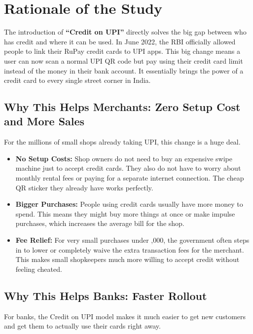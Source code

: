 \chapter{Rationale of the Study}

The introduction of \textbf{``Credit on UPI''} directly solves the big gap between who has credit and where it can be used. In June 2022, the RBI officially allowed people to link their RuPay credit cards to UPI apps. This big change means a user can now scan a normal UPI QR code but pay using their credit card limit instead of the money in their bank account. It essentially brings the power of a credit card to every single street corner in India.

\section{Why This Helps Merchants: Zero Setup Cost and More Sales}

For the millions of small shops already taking UPI, this change is a huge deal.

\begin{itemize}
    \item \textbf{No Setup Costs:} Shop owners do not need to buy an expensive swipe machine just to accept credit cards. They also do not have to worry about monthly rental fees or paying for a separate internet connection. The cheap QR sticker they already have works perfectly.
    \item \textbf{Bigger Purchases:} People using credit cards usually have more money to spend. This means they might buy more things at once or make impulse purchases, which increases the average bill for the shop.
    \item \textbf{Fee Relief:} For very small purchases under ,000, the government often steps in to lower or completely waive the extra transaction fees for the merchant. This makes small shopkeepers much more willing to accept credit without feeling cheated.
\end{itemize}

\section{Why This Helps Banks: Faster Rollout}

For banks, the Credit on UPI model makes it much easier to get new customers and get them to actually use their cards right away.

